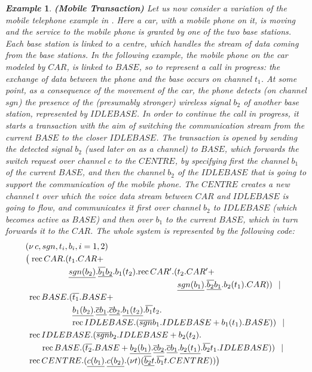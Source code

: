 \documentclass[submission,copyright,creativecommons]{eptcs}
\newcommand{\restr}[1]{\mbox{$({\bf\nu} #1)$}}
\newcommand{\para}{\mbox{$\,|\,$}}
\newcommand{\rec}[2]{\mbox{rec}\, #1.#2}
\newtheorem{aexample}{\it Example}
\newenvironment{example}{\begin{aexample} }{\end{aexample}}
\begin{document}
\begin{example}\label{ex-mobile-finance}
{\bf(Mobile Transaction)} Let us now consider a variation of the mobile telephone example in \cite{Mil99}.
Here a car, with a mobile phone on it, is moving and the service to the mobile phone is granted
by one of the two base stations. Each base station is linked to a centre, which handles the stream of data coming from the base stations.
In the following example, the mobile phone on the car modeled by $CAR$, is linked to $BASE$, so to represent a call in progress: the exchange of data between the phone and the base occurs on
channel $t_1$. At some point, as a consequence of the movement of the car, the phone detects (on channel $sgn$) the presence of the (presumably stronger) wireless signal $b_2$ of another base station, represented by $IDLEBASE$. In order to continue the call in progress, it starts a transaction 
with the aim of switching the communication stream from the current $BASE$ to the closer $IDLEBASE$.
The transaction is opened by sending the detected signal $b_2$ (used later on as a channel) to
$BASE$, which forwards the switch request over channel $c$ to the $CENTRE$, by specifying first the channel $b_1$ of the current $BASE$, and then the channel $b_2$ of the $IDLEBASE$ that is going to
support the communication of the mobile phone. The $CENTRE$ creates a new channel $t$ over which the
voice data stream between $CAR$ and $IDLEBASE$ is going to flow, and communicates it first over channel $b_2$ to $IDLEBASE$ (which becomes active as $BASE$) and then over $b_1$ to the current $BASE$,
which in turn forwards it to the $CAR$. The whole system is represented by the following code:
\[\begin{array}{l}
(\nu\, c, sgn, t_{i}, b_{i}, i=1,2) \\[1mm]
\big(\;\rec{CAR}(t_1.CAR + \\[1mm] 
\phantom{\big(\;\rec{CAR}(} \underline{sgn(b_2)}.\underline{\overline{b_1} b_2}.b_1(t_2).
          \rec{CAR'}(t_2.CAR' + \\[1mm] 
\phantom{\big(\;\rec{CAR}(\underline{sgn(b_2)}.\underline{\overline{b_1} b_2}.b_1(t_2).
          \rec{CAR'}(} \underline{sgn(b_1)}.\underline{\overline{b_2}b_1}.b_2(t_1).CAR ))
 \;\; \para \\[1mm]
\phantom{\big(} \rec{BASE}(\overline{t_1}.BASE + \\[1mm]
\phantom{\big( \rec{BASE}(} \underline{b_1(b_2)}.\underline{\overline c b_1}.\underline{\overline c b_2}.\underline{b_1(t_2)}.\overline{b_1}t_2. \\[1mm]
\phantom{\big( \rec{BASE}(} \rec{IDLEBASE}(\overline{sgn}b_1.IDLEBASE + b_1(t_1).BASE) ) \;\; \para \\[1mm]
\phantom{\big(} \rec{IDLEBASE}( \overline{sgn}b_2.IDLEBASE +
  b_2(t_2). \\[1mm] \qquad
  \rec{BASE}(\overline{t_2}.BASE + \underline{b_2(b_1)}.\underline{\overline c b_2}.
\underline{\overline c b_1}. \underline{b_2(t_1)}.\overline{b_2}t_1.IDLEBASE)) \;\; \para \\[1mm]
\phantom{\big(} \rec{CENTRE}(\underline{c(b_1)}.\underline{c(b_2)}.\restr{t}
(\underline{\overline{b_2}t}.\overline{b_1}t.CENTRE)) \big)
\end{array}\]


\end{example}
\end{document}
